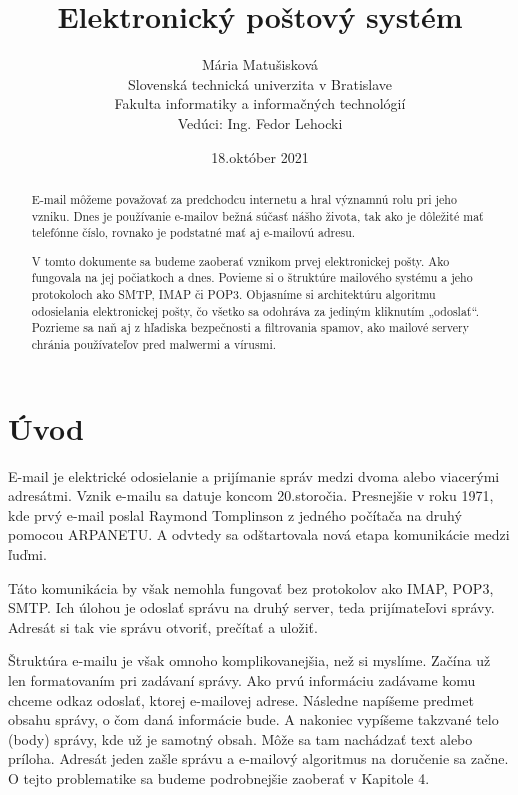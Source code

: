 \documentclass[10pt,slovak,twoside,a4paper]{article}
\title{\bf Elektronický poštový systém} %
\author{Mária Matušisková\\[2pt]
	{\small Slovenská technická univerzita v Bratislave}\\
	{\small Fakulta informatiky a informačných technológií}\\
	{\small Vedúci: Ing. Fedor Lehocki}
	}
\date{\small 18.október 2021} %
\begin{document}
\maketitle


\begin{abstract}

E-mail môžeme považovať za predchodcu internetu a hral významnú rolu pri jeho vzniku. Dnes je používanie e-mailov bežná súčasť nášho života, tak ako je dôležité mať telefónne číslo, rovnako je podstatné mať aj e-mailovú adresu. 

V tomto dokumente sa budeme zaoberať vznikom prvej elektronickej pošty. Ako fungovala na jej počiatkoch a dnes. Povieme si o štruktúre mailového systému a jeho protokoloch ako SMTP, IMAP či POP3. Objasníme si architektúru algoritmu odosielania elektronickej pošty, čo všetko sa odohráva za jediným kliknutím „odoslať“. Pozrieme sa naň aj z hľadiska bezpečnosti a filtrovania spamov,  ako mailové servery chránia používateľov pred malwermi a vírusmi.

\end{abstract}



\section{Úvod}
E-mail je elektrické odosielanie a prijímanie správ medzi dvoma alebo viacerými adresátmi. Vznik e-mailu sa datuje koncom 20.storočia. Presnejšie v roku 1971, kde prvý e-mail poslal Raymond Tomplinson z jedného počítača na druhý pomocou ARPANETU. A odvtedy sa odštartovala nová etapa komunikácie medzi ľuďmi. 

Táto komunikácia by však nemohla fungovať bez protokolov ako IMAP, POP3, SMTP. Ich úlohou je odoslať správu na druhý server, teda prijímateľovi správy. Adresát si tak vie správu otvoriť, prečítať a uložiť. 

Štruktúra e-mailu je však omnoho komplikovanejšia, než si myslíme. Začína už len formatovaním pri zadávaní správy. Ako prvú informáciu zadávame komu chceme odkaz odoslať, ktorej e-mailovej adrese. Následne napíšeme predmet obsahu správy, o čom daná informácie bude. A nakoniec vypíšeme takzvané telo (body) správy, kde už je samotný obsah. Môže sa tam nachádzať text alebo príloha. Adresát jeden zašle správu a e-mailový algoritmus na doručenie sa začne. O tejto problematike sa budeme podrobnejšie zaoberať v Kapitole 4. 
\end{document}
